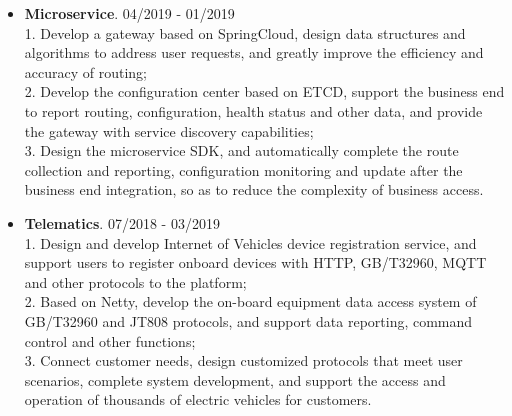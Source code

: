 \documentclass[letterpaper, UTF8]{article}
\begin{document}
\begin{itemize}
		\item \textbf{Microservice}. 04/2019 - 01/2019\\
		1. Develop a gateway based on SpringCloud, design data structures and algorithms to address user requests, and greatly improve the efficiency and accuracy of routing; \\
		2. Develop the configuration center based on ETCD, support the business end to report routing, configuration, health status and other data, and provide the gateway with service discovery capabilities; \\
		3. Design the microservice SDK, and automatically complete the route collection and reporting, configuration monitoring and update after the business end integration, so as to reduce the complexity of business access.
		
		\item \textbf{Telematics}. 07/2018 - 03/2019\\
		1. Design and develop Internet of Vehicles device registration service, and support users to register onboard devices with HTTP, GB/T32960, MQTT and other protocols to the platform; \\
		2. Based on Netty, develop the on-board equipment data access system of GB/T32960 and JT808 protocols, and support data reporting, command control and other functions; \\
		3. Connect customer needs, design customized protocols that meet user scenarios, complete system development, and support the access and operation of thousands of electric vehicles for customers.
	\end{itemize}
	\vspace{-0.32in}
	
	\bigskip
\end{document}
